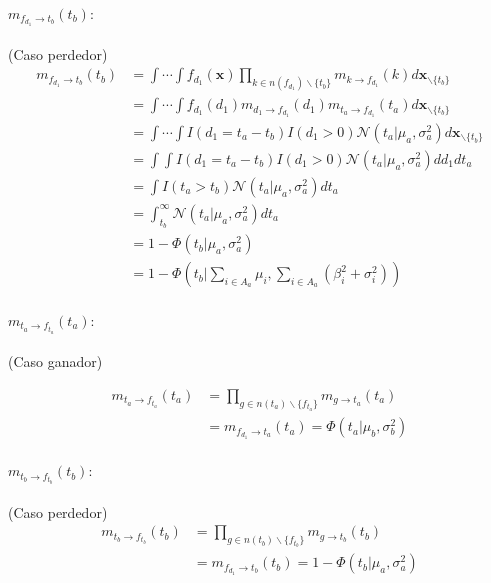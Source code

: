 \documentclass[11pt,twoside,spanish]{report} %
\begin{document}
\paragraph{$m_{f_{d_1} \rightarrow t_b}(t_b):$} (Caso perdedor)
\begin{equation}
	\begin{split}
		m_{f_{d_1}\rightarrow t_b}(t_b) & = \int\cdots\int f_{d_1}(\textbf{x})\prod_{k\in n(f_{d_1})\backslash\{t_b\}} m_{k\rightarrow f_{d_1}}(k)d\textbf{x}_{\backslash \{t_b\}} \\
		& = \int\cdots\int f_{d_1}(d_1)m_{d_1\rightarrow f_{d_1}}(d_1)m_{t_a\rightarrow f_{d_1}}(t_a)d\textbf{x}_{\backslash\{t_b\}}\\
		& = \int\cdots\int I(d_1=t_a-t_b)I(d_1>0)\mathcal{N}(t_a \vert \mu_a,\sigma_a^2)d\textbf{x}_{\backslash\{t_b\}}\\
		& =\int\int  I(d_1=t_a-t_b)I(d_1>0)\mathcal{N}(t_a \vert \mu_a,\sigma_a^2)dd_1dt_a\\
		& =\int I(t_a>t_b)\mathcal{N}(t_a \vert \mu_a,\sigma_a^2)dt_a\\
		& =\int_{t_b}^{\infty}\mathcal{N}(t_a \vert \mu_a,\sigma_a^2)dt_a\\
		& = 1 - \Phi(t_b \vert \mu_a,\sigma_a^2) \\
		& =  1- \Phi(t_b \vert \sum_{i\in A_a}\mu_i,\sum_{i\in A_a}(\beta_i^2+\sigma_i^2))
	\end{split}
\end{equation}

\paragraph{$m_{t_a \rightarrow f_{t_a}}(t_a):$} (Caso ganador)

\begin{equation}
	\begin{split}
		m_{t_a \rightarrow f_{t_a}}(t_a) & = \prod_{g\in n(t_a)\backslash\{f_{t_a}\}} m_{g \rightarrow t_a} (t_a) \\
		&=  m_{f_{d_1} \rightarrow t_a} (t_a)=\Phi(t_a|\mu_b,\sigma_b^2)
	\end{split}
\end{equation}

\paragraph{$m_{t_b \rightarrow f_{t_b}}(t_b):$} (Caso perdedor)
\begin{equation}
	\begin{split}
		m_{t_b \rightarrow f_{t_b}}(t_b) & =\prod_{g\in n(t_b)\backslash\{f_{t_b}\}} m_{g \rightarrow t_b} (t_b)\\
		&=  m_{f_{d_1} \rightarrow t_b} (t_b)=1- \Phi(t_b|\mu_a,\sigma_a^2)
	\end{split}
\end{equation}
\end{document}
